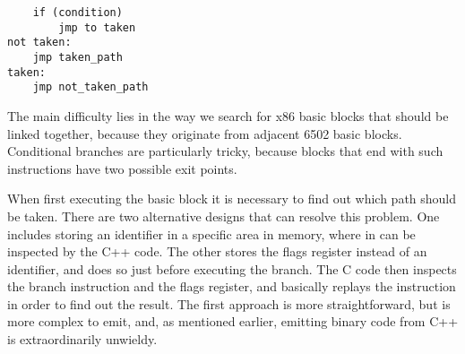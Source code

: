 \begin{lstlisting}
	if (condition)
		jmp to taken
not taken:	
	jmp taken_path
taken:		
	jmp not_taken_path
\end{lstlisting}

The main difficulty lies in the way we search for x86 basic blocks that should be linked together, because they originate from adjacent 6502 basic blocks. 
Conditional branches are particularly tricky, because blocks that end with such instructions have two possible exit points. 

When first executing the basic block it is necessary to find out which path should be taken. 
There are two alternative designs that can resolve this problem.
One includes storing an identifier in a specific area in memory, where in can be inspected by the C++ code.
The other stores the flags register instead of an identifier, and does so just before executing the branch.
The C code then inspects the branch instruction and the flags register, and basically replays the instruction in order to find out the result.
The first approach is more straightforward, but is more complex to emit, and, as mentioned earlier, emitting binary code from C++ is extraordinarily unwieldy.

